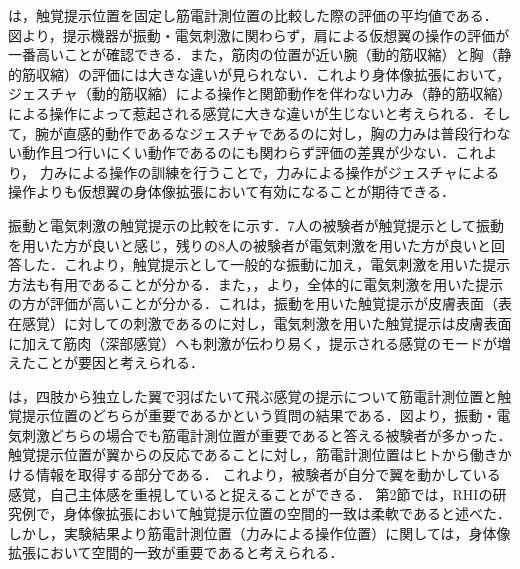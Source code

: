\begin{small}
        は，触覚提示位置を固定し筋電計測位置の比較した際の評価の平均値である．
        図より，提示機器が振動・電気刺激に関わらず，肩による仮想翼の操作の評価が一番高いことが確認できる．また，筋肉の位置が近い腕（動的筋収縮）と胸（静的筋収縮）の評価には大きな違いが見られない．これより身体像拡張において，ジェスチャ（動的筋収縮）による操作と関節動作を伴わない力み（静的筋収縮）による操作によって惹起される感覚に大きな違いが生じないと考えられる．そして，腕が直感的動作であるなジェスチャであるのに対し，胸の力みは普段行わない動作且つ行いにくい動作であるのにも関わらず評価の差異が少ない．これより，
        力みによる操作の訓練を行うことで，力みによる操作がジェスチャによる操作よりも仮想翼の身体像拡張において有効になることが期待できる．

        振動と電気刺激の触覚提示の比較をに示す．7人の被験者が触覚提示として振動を用いた方が良いと感じ，残りの8人の被験者が電気刺激を用いた方が良いと回答した．これより，触覚提示として一般的な振動に加え，電気刺激を用いた提示方法も有用であることが分かる．また，，より，全体的に電気刺激を用いた提示の方が評価が高いことが分かる．これは，振動を用いた触覚提示が皮膚表面（表在感覚）に対しての刺激であるのに対し，電気刺激を用いた触覚提示は皮膚表面に加えて筋肉（深部感覚）へも刺激が伝わり易く，提示される感覚のモードが増えたことが要因と考えられる．

        は，四肢から独立した翼で羽ばたいて飛ぶ感覚の提示について筋電計測位置と触覚提示位置のどちらが重要であるかという質問の結果である．図より，振動・電気刺激どちらの場合でも筋電計測位置が重要であると答える被験者が多かった．
        触覚提示位置が翼からの反応であることに対し，筋電計測位置はヒトから働きかける情報を取得する部分である．
        これより，被験者が自分で翼を動かしている感覚，自己主体感を重視していると捉えることができる．
        第2節では，RHIの研究例で，身体像拡張において触覚提示位置の空間的一致は柔軟であると述べた．しかし，実験結果より筋電計測位置（力みによる操作位置）に関しては，身体像拡張において空間的一致が重要であると考えられる．



\end{small}
